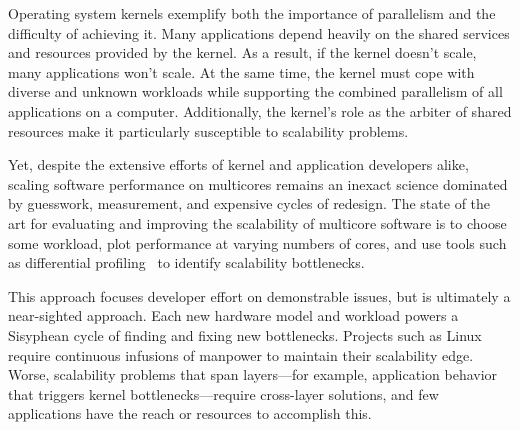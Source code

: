 Operating system kernels exemplify both the importance
of parallelism and the difficulty of achieving it.
%
Many applications depend heavily on the shared services and resources
provided by the kernel.
%
As a result, if the kernel doesn't scale, many applications won't
scale.
%
At the same time, the kernel must cope with diverse and unknown
workloads while supporting the combined parallelism of all
applications on a computer.  Additionally, the kernel's role as the
arbiter of shared resources make it particularly susceptible to
scalability problems.
%
%

Yet, despite the extensive efforts of kernel and application
developers alike, scaling software performance on multicores remains
an inexact science dominated by guesswork, measurement, and expensive
cycles of redesign.
%
The state of the art for evaluating and improving the scalability of
multicore software is to choose some workload, plot performance at
varying numbers of cores, and use tools such as differential
profiling~\cite{mckenney:differential} to identify scalability
bottlenecks.
%

This approach focuses developer effort on demonstrable issues, but is
ultimately a near-sighted approach.
%
%
Each new hardware model and workload powers a Sisyphean cycle of
finding and fixing new bottlenecks.
%
Projects such as Linux require continuous infusions of manpower to
maintain their scalability edge.
%
Worse, scalability problems that span layers---for example,
application behavior that triggers kernel bottlenecks---require
cross-layer solutions, and few applications have the reach or
resources to accomplish this.


